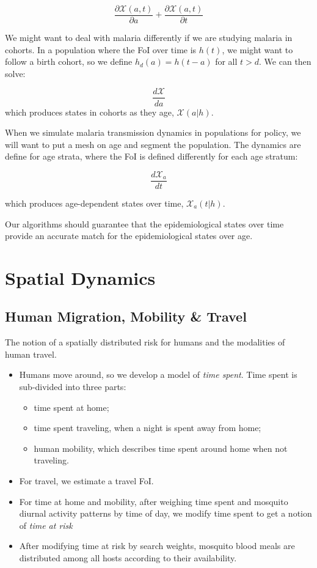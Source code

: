 \documentclass[
]{book}
\begin{document}
\[\frac{\partial {\mathscr X}(a,t)}{\partial a} + \frac{\partial {\mathscr X}(a,t)}{\partial t}\]

We might want to deal with malaria differently if we are studying malaria in cohorts. In a population where the FoI over time is \(h(t)\), we might want to follow a birth cohort, so we define \(h_d(a) = h(t-a)\) for all \(t>d\). We can then solve:

\[\frac{d{\mathscr X}}{d a} \]
which produces states in cohorts as they age, \({\mathscr X}(a|h).\)

When we simulate malaria transmission dynamics in populations for policy, we will want to put a mesh on age and segment the population. The dynamics are define for age strata, where the FoI is defined differently for each age stratum:

\[\frac{d{\mathscr X}_a}{d t}\]

which produces age-dependent states over time, \({\mathscr X}_a(t|h).\)

Our algorithms should guarantee that the epidemiological states over time provide an accurate match for the epidemiological states over age.

\section{Spatial Dynamics}\label{spatial-dynamics}

\subsection{Human Migration, Mobility \& Travel}\label{human-migration-mobility-travel}

The notion of a spatially distributed risk for humans and the modalities of human travel.

\begin{itemize}
\item
  Humans move around, so we develop a model of \emph{time spent}. Time spent is sub-divided into three parts:

  \begin{itemize}
  \item
    time spent at home;
  \item
    time spent traveling, when a night is spent away from home;
  \item
    human mobility, which describes time spent around home when not traveling.
  \end{itemize}
\item
  For travel, we estimate a travel FoI.
\item
  For time at home and mobility, after weighing time spent and mosquito diurnal activity patterns by time of day, we modify time spent to get a notion of \emph{time at risk}
\item
  After modifying time at risk by search weights, mosquito blood meals are distributed among all hosts according to their availability.
\end{itemize}
\end{document}

